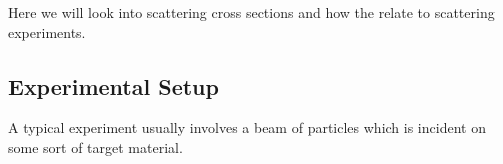 Here we will look into scattering cross sections and how the relate to scattering experiments.

\subsection{Experimental Setup}
A typical experiment usually involves a beam of particles which is incident on some sort of target material.
